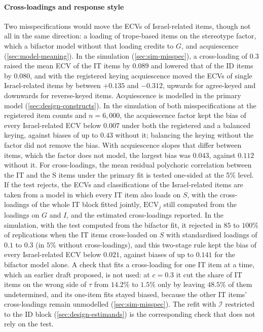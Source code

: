 \paragraph{Cross-loadings and response style}
Two misspecifications would move the ECVs of Israel-related items, though not all in the same direction: a loading of trope-based items on the stereotype factor, which a bifactor model without that loading credits to $G$, and acquiescence (\cref{sec:model-meaning}). In the simulation (\cref{sec:sim-misspec}), a cross-loading of $0.3$ raised the mean ECV of the IT items by $0.089$ and lowered that of the ID items by $0.080$, and with the registered keying acquiescence moved the ECVs of single Israel-related items by between $+0.135$ and $-0.312$, upwards for agree-keyed and downwards for reverse-keyed items. Acquiescence is modelled in the primary model (\cref{sec:design-constructs}). In the simulation of both misspecifications at the registered item counts and $n=6{,}000$, the acquiescence factor kept the bias of every Israel-related ECV below $0.007$ under both the registered and a balanced keying, against biases of up to $0.43$ without it; balancing the keying without the factor did not remove the bias. With acquiescence slopes that differ between items, which the factor does not model, the largest bias was $0.043$, against $0.112$ without it. For cross-loadings, the mean residual polychoric correlation between the IT and the S items under the primary fit is tested one-sided at the 5\% level. If the test rejects, the ECVs and classifications of the Israel-related items are taken from a model in which every IT item also loads on $S$, with the cross-loadings of the whole IT block fitted jointly, $\mathrm{ECV}_j$ still computed from the loadings on $G$ and $I$, and the estimated cross-loadings reported. In the simulation, with the test computed from the bifactor fit, it rejected in $85$ to $100\%$ of replications when the IT items cross-loaded on $S$ with standardised loadings of $0.1$ to $0.3$ (in $5\%$ without cross-loadings), and this two-stage rule kept the bias of every Israel-related ECV below $0.021$, against biases of up to $0.141$ for the bifactor model alone. A check that fits a cross-loading for one IT item at a time, which an earlier draft proposed, is not used: at $c=0.3$ it cut the share of IT items on the wrong side of $\tau$ from $14.2\%$ to $1.5\%$ only by leaving $48.5\%$ of them undetermined, and its one-item fits stayed biased, because the other IT items' cross-loadings remain unmodelled (\cref{sec:sim-misspec}). The refit with $\mathcal I$ restricted to the ID block (\cref{sec:design-estimands}) is the corresponding check that does not rely on the test.

